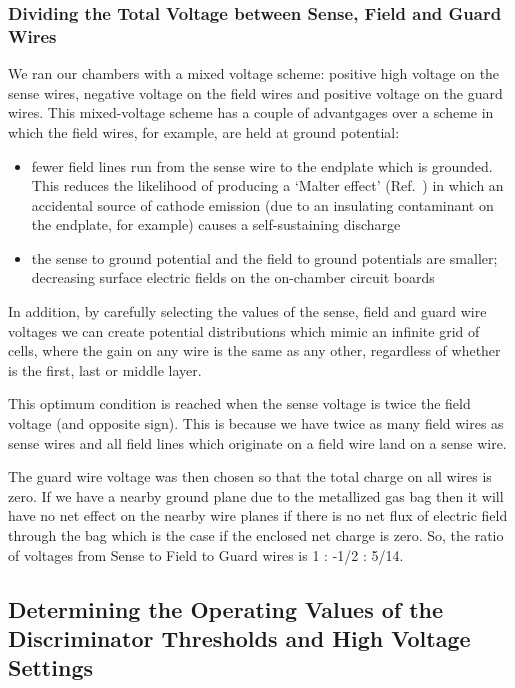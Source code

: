 \subsubsection{Dividing the Total Voltage between Sense, Field and Guard Wires}
We ran our chambers with a mixed voltage scheme:
positive high voltage on the sense wires, negative voltage on the
field wires and positive voltage on the guard wires.
This mixed-voltage scheme has a couple of advantgages over a scheme in
which the field wires, for example, are held at ground potential:
\begin{itemize}
\item fewer field lines run from the sense wire to the endplate which
is grounded.  This reduces the likelihood of producing a `Malter effect'
(Ref.~\cite{malter}) in which an accidental source of cathode emission
(due to an insulating contaminant on the endplate, for example) causes
a self-sustaining discharge
\item the sense to ground potential and the field to ground potentials 
are smaller; decreasing surface electric fields on the on-chamber
circuit boards
\end{itemize}

In addition, by carefully selecting the values of the sense, field and
guard wire voltages we can create potential distributions which mimic
an infinite grid of cells, where the gain on any wire is the same as
any other, regardless of whether is the first, last or middle layer.

This optimum condition is reached when the sense voltage is twice the
field voltage (and opposite sign).  This is because we have twice as many
field wires as sense wires and all field lines which originate on a
field wire land on a sense wire.  

The guard wire voltage was then chosen so that the total charge on all wires is zero.  
If we have a nearby ground plane due to the metallized gas bag then it will
have no net effect on the nearby wire planes if there is no net flux of
electric field through the bag which is the case if the enclosed net charge
is zero.
So, the ratio of voltages from Sense to Field to Guard wires is 1 : -1/2 : 5/14.




\subsection{Determining the Operating Values of the Discriminator Thresholds and High Voltage Settings}

